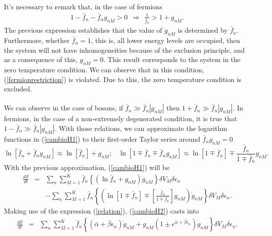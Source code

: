 \documentclass{article}
\newcommand{\de}{\delta}
\newcommand{\Ss}{\mathcal{S}}
\begin{document}
It's necessary to remark that, in the case of fermions
\begin{eqnarray}
   1-\bar f_n -\bar f_n g_{nM}>0 \ \ \Rightarrow \ \ \frac{1}{\bar f_n}>1+g_{nM}. \label{fermionrestriction}
\end{eqnarray}{}
The previous expression establishes that the value of $g_{nM}$ is determined by $\bar f_n$. Furthermore, whether $\bar f_{n}=1$, this is, all lower energy levels are occupied, then the system will not have inhomogeneities because of the exclusion principle, and as a consequence of this,  $g_{nM}=0$. This result corresponds to the system in the zero temperature condition. We can observe that in this condition, (\ref{fermionrestriction}) is violated. Due to this, the zero temperature condition is excluded.\\
\\
We can observe in the case of bosons, if $\bar{f}_n \gg \bar{f}_n |g_{nM}|$ then $1+\bar{f}_n \gg \bar{f}_n |g_{nM}|$. In fermions, in the case of a non-extremely degenerated condition, it is true that $1-\bar{f}_n \gg \bar{f}_n |g_{nM}|$. With those relations, we can approximate the logarithm functions in (\ref{cambioH1}) to their first-order Taylor series around $\bar f_n g_{nM}=0$ 
\begin{equation}
    \ln [\bar{f}_n+\bar{f}_n g_{nM}] \approx \ln [\bar{f}_n]+ g_{nM}; \ \ \ \ \ln[1\mp\bar{f}_n\mp\bar{f}_n g_{nM}] \approx \ln[1\mp\bar{f}_n]\mp\frac{\bar{f}_n}{1\mp\bar{f}_{n}} g_{nM}. \label{lnapproximation}
\end{equation}{}
With the previous approximation, (\ref{cambioH1}) will be
\begin{eqnarray}
    \frac{d\Ss}{dt}&=&\sum_n \sum_{M=1}^{K} \bar{f}_n\left \{ (\ln \bar{f}_n+ g_{nM})\dot{g}_{nM}\right\} \de V_M \delta \epsilon_n \nonumber \\
    &&-\sum_{n}\sum_{M=1}^{K}\bar f_n\left\{ \left( \ln[1\mp\bar{f}_n]\mp \left[\frac{\bar{f}_n}{1\mp\bar{f}_n} \right] g_{nM}\right)\dot{g}_{nM} \right \}\de V_M \delta \epsilon_n.\label{cambioH2}
\end{eqnarray}{}
Making use of the expression (\ref{relation}),
(\ref{cambioH2}) casts into
\begin{eqnarray}
    \frac{d\Ss}{dt}&=&\sum_n \sum_{M=1}^{K} \bar{f}_n\left \{ (\bar{\alpha}+\bar{\beta}{\epsilon}_n)\dot{g}_{nM}+ g_{nM}\left(1\pm e^{\bar{\alpha}+\bar{\beta}{\epsilon}_n}\right)\dot{g}_{nM} \right \} \de V_M \delta \epsilon_n. \nonumber \\
    \label{cambioH3}
\end{eqnarray}{}
\end{document}
